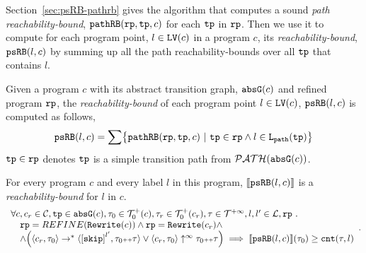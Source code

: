 Section~\ref{sec:psRB-pathrb} gives the algorithm that computes a sound \emph{path reachability-bound}, $\mathtt{pathRB}(\mathtt{rp}, \mathtt{tp}, c)$ for each $\mathtt{tp}$ in $\mathtt{rp}$.
Then we use it to compute for each program point, $l \in \mathtt{LV}(c)$ in a program $c$,
its \emph{reachability-bound}, $\mathtt{psRB}(l, c)$ by summing up all the path reachability-bounds over all $\mathtt{tp}$ that contains $l$.
%
\begin{defn}
\label{def:point_psrb}
Given a program $c$ with its {abstract transition graph}, $\mathtt{abs}{\mathtt{G}}(c)$ and refined program $\mathtt{rp}$,
the \emph{reachability-bound} of each program point $l \in \mathtt{LV}(c)$, $\mathtt{psRB}(l, c)$ is computed as follows,
\[ 
 \psRB(l, c) = 
 \sum
 \left\{ \inoutB(\rprog, \tpath, c) ~\vert~ \tpath \in \rprog \land 
 l \in \pathl(\tpath) \right\}
\]
$\mathtt{tp} \in \mathtt{rp}$ denotes $\mathtt{tp}$ is a simple transition path from $\mathcal{PATH}(\mathtt{abs}{\mathtt{G}}(c))$.
\end{defn}

\begin{thm}[Soundness]
\label{thm:pathsensitive_rb_soundness}
For every program ${c}$ and every label $l$ in this program,
$\llbracket \mathtt{psRB}(l, c) \rrbracket$ is a \emph{reachability-bound} for $l$ in $c$.
%
{\small
\[
 \begin{array}{l}
 \forall c, c_r \in \cdom, \tpath \in \absG(c), \trace_0 \in \ftdom_0(c), \trace_r \in \ftdom_0(c_r), \trace \in \tdom, l, l' \in \ldom, \rprog \sthat 
 \\ \quad
 \rprog = REFINE(\algrewrite(c))
 \land 
 \rprog = \algrewrite(c_r)
 \land
 \\ \quad
 \land
 \Big(
 \config{c_r, \trace_0} \rightarrow^* \config{\clabel{\eskip}^{l'}, \trace_0 \tracecat \trace}
 \lor \config{c_r, \trace_0} \uparrow^{\infty} \trace_0 \tracecat \trace 
 \Big)
 \implies \econfig{\psRB(l, c)}(\trace_0) \geq \counter(\trace, l)
 \end{array}.
\]
}
\end{thm}